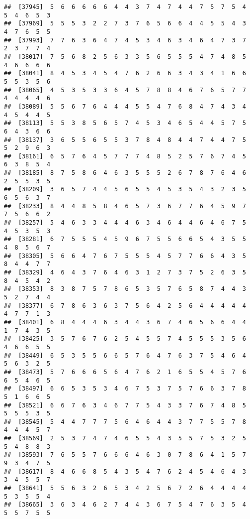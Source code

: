 \documentclass[
]{book}
\begin{document}
\begin{verbatim}
##  [37945]  5  6  6  6  6  6  4  4  3  7  4  7  4  4  7  5  7  5  4  5  4  6  5  3
##  [37969]  5  5  5  3  2  2  7  3  7  6  5  6  6  4  4  5  5  4  3  4  7  6  5  5
##  [37993]  7  7  6  3  6  4  7  4  5  3  4  6  3  4  6  4  7  3  7  2  3  7  7  4
##  [38017]  7  5  6  8  2  5  6  3  3  5  6  5  5  5  4  7  4  8  5  4  6  6  6  6
##  [38041]  8  4  5  3  4  5  4  7  6  2  6  6  3  4  3  4  1  6  6  5  5  3  5  6
##  [38065]  4  5  3  5  3  3  6  4  5  7  8  8  4  6  7  6  5  7  7  4  4  4  4  6
##  [38089]  5  5  6  7  6  4  4  4  5  5  4  7  6  8  4  7  4  3  4  4  5  4  4  5
##  [38113]  5  5  3  8  5  6  5  7  4  5  3  4  6  5  4  4  5  7  5  6  4  3  6  6
##  [38137]  3  6  5  5  6  5  5  3  7  8  4  8  4  4  7  4  4  7  5  5  2  9  6  3
##  [38161]  6  5  7  6  4  5  7  7  7  4  8  5  2  5  7  6  7  4  5  6  3  8  5  4
##  [38185]  8  7  5  8  6  4  6  3  5  5  5  2  6  7  8  7  6  4  6  2  5  5  3  5
##  [38209]  3  6  5  7  4  4  5  6  5  5  4  5  3  5  4  3  2  3  5  6  5  6  3  7
##  [38233]  8  4  4  8  5  8  4  6  5  7  3  6  7  7  6  4  5  9  7  7  5  6  6  2
##  [38257]  5  4  6  3  3  4  4  4  6  3  4  6  4  4  6  4  6  7  5  4  5  3  5  3
##  [38281]  6  7  5  5  5  4  5  9  6  7  5  5  6  6  5  4  3  5  5  4  8  5  6  7
##  [38305]  5  6  6  4  7  6  7  5  5  5  4  5  7  7  6  6  4  3  5  8  4  4  7  7
##  [38329]  4  6  4  3  7  6  4  6  3  1  2  7  3  7  5  2  6  3  5  8  4  5  4  2
##  [38353]  8  3  8  7  5  7  8  6  5  3  5  7  6  5  8  7  4  4  3  5  2  7  4  4
##  [38377]  6  7  8  6  3  6  3  7  5  6  4  2  5  6  4  4  4  4  4  4  7  7  1  3
##  [38401]  6  8  4  4  4  6  3  4  4  3  6  7  4  6  5  6  6  4  4  1  7  4  3  5
##  [38425]  3  5  7  6  7  6  2  5  4  5  5  7  4  5  5  5  3  5  6  4  6  6  5  5
##  [38449]  6  5  3  5  5  6  6  5  7  6  4  7  6  3  7  5  4  6  4  5  6  3  2  5
##  [38473]  5  7  6  6  6  5  6  4  7  6  2  1  6  5  5  4  5  7  6  6  5  4  6  5
##  [38497]  6  6  5  3  5  3  4  6  7  5  3  7  5  7  6  6  3  7  8  5  1  6  6  5
##  [38521]  6  6  7  6  3  4  6  7  7  5  4  3  3  7  6  7  4  8  5  5  5  5  3  5
##  [38545]  5  4  4  7  7  7  5  6  4  6  4  4  3  7  7  5  5  7  8  4  4  4  5  7
##  [38569]  2  5  3  7  4  7  4  6  5  5  4  3  5  5  7  5  3  2  5  5  4  8  8  3
##  [38593]  7  6  5  5  7  6  6  6  4  6  3  0  7  8  6  4  1  5  7  9  3  4  7  5
##  [38617]  8  4  6  6  8  5  4  3  5  4  7  6  2  4  5  4  6  4  3  3  4  5  5  7
##  [38641]  5  5  6  3  2  6  5  3  4  2  5  6  7  2  6  4  4  4  4  5  3  5  5  4
##  [38665]  3  6  3  4  6  2  7  4  4  3  6  7  5  4  7  6  3  5  4  5  5  7  5  5

\end{verbatim}
\end{document}
